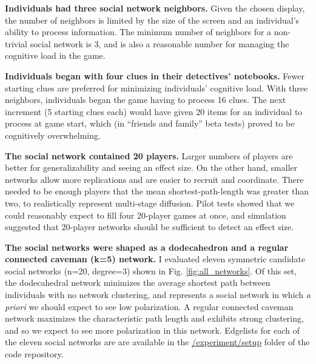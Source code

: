 \documentclass{article}
\begin{document}
\textbf{Individuals had three social network neighbors.} 
Given the chosen display, the number of neighbors is limited by the size of the screen and an individual’s ability to process information. The minimum number of neighbors for a non-trivial social network is 3, and is also a reasonable number for managing the cognitive load in the game.

\textbf{Individuals began with four clues in their detectives' notebooks.}
Fewer starting clues are preferred for minimizing individuals' cognitive load. With three neighbors, individuals began the game having to process 16 clues. The next increment (5 starting clues each) would have given 20 items for an individual to process at game start, which (in ``friends and family'' beta tests) proved to be cognitively overwhelming.

\textbf{The social network contained 20 players.}
Larger numbers of players are better for generalizability and seeing an effect size. On the other hand, smaller networks allow more replications and are easier to recruit and coordinate. There needed to be enough players that the mean shortest-path-length was greater than two, to realistically represent multi-stage diffusion. Pilot tests showed that we could reasonably expect to fill four 20-player games at once, and simulation suggested that 20-player networks should be sufficient to detect an effect size.

\textbf{The social networks were shaped as a dodecahedron and a regular connected caveman (k=5) network.}
I evaluated eleven symmetric candidate social networks (n=20, degree=3) shown in Fig. \ref{fig:all_networks}. Of this set, the dodecahedral network minimizes the average shortest path between individuals with no network clustering, and represents a social network in which \textit{a priori} we should expect to see low polarization. A regular connected caveman network maximizes the characteristic path length and exhibits strong clustering, and so we expect to see more polarization in this network. Edgelists for each of the eleven social networks are are available in the \href{https://github.com/JamesPHoughton/interdependent-diffusion/tree/master/experiment/setup}{/experiment/setup} folder of the code repository.
\end{document}
